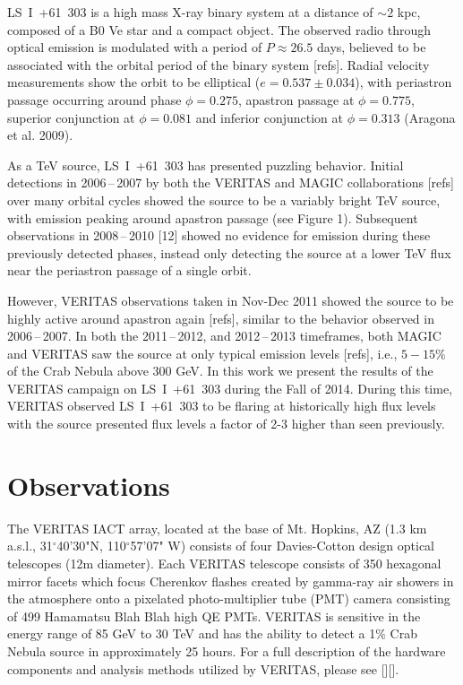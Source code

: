\documentclass[preprint2]{aastex}
\newcommand{\lsi}{LS~I~+61~303}
\begin{document}
\lsi{} is a high mass X-ray binary system at a distance of $\sim2$ kpc, composed of a B0 Ve star and a compact object. The observed radio through optical emission is modulated with a period of $P \approx 26.5$ days, believed to be associated with the orbital period of the binary system [refs]. Radial velocity measurements show the orbit to be elliptical ($e = 0.537\pm0.034$), with periastron passage occurring around phase $\phi=0.275$, apastron passage at $\phi=0.775$, superior conjunction at $\phi=0.081$ and inferior conjunction at $\phi=0.313$ (Aragona et al. 2009).

As a TeV source, \lsi{} has presented puzzling behavior. Initial detections in 2006\,--\,2007 by both the VERITAS and MAGIC collaborations [refs] over many orbital cycles showed the source to be a variably bright TeV source, with emission peaking around apastron passage (see Figure 1). Subsequent observations in 2008\,--\,2010 [12] showed no evidence for emission during these previously detected phases, instead only detecting the source at a lower TeV flux near the periastron passage of a single orbit. 

However, VERITAS observations taken in Nov-Dec 2011 showed the source to be highly active around apastron again [refs], similar to the behavior observed in 2006\,--\,2007. In both the 2011\,--\,2012, and 2012\,--\,2013 timeframes, both MAGIC and VERITAS saw the source at only typical emission levels [refs], i.e., $5-15\%$ of the Crab Nebula above 300 GeV. In this work we present the results of the VERITAS campaign on \lsi{} during the Fall of 2014. During this time, VERITAS observed \lsi{} to be flaring at historically high flux levels with the source presented flux levels a factor of 2-3 higher than seen previously. 


\section{Observations}
The VERITAS IACT array, located at the base of Mt. Hopkins, AZ (1.3 km a.s.l., 31$^{\circ}$40'30"N, 110$^{\circ}$57'07" W) consists of four Davies-Cotton design optical telescopes (12m diameter). Each VERITAS telescope consists of 350 hexagonal mirror facets which focus Cherenkov flashes created by gamma-ray air showers in the atmosphere onto a pixelated photo-multiplier tube (PMT) camera consisting of 499 Hamamatsu Blah Blah high QE PMTs. VERITAS is sensitive in the energy range of 85 GeV to 30 TeV and has the ability to detect a 1$\%$ Crab Nebula source in approximately 25 hours. For a full description of the hardware components and analysis methods utilized by VERITAS, please see [][].
\end{document}

